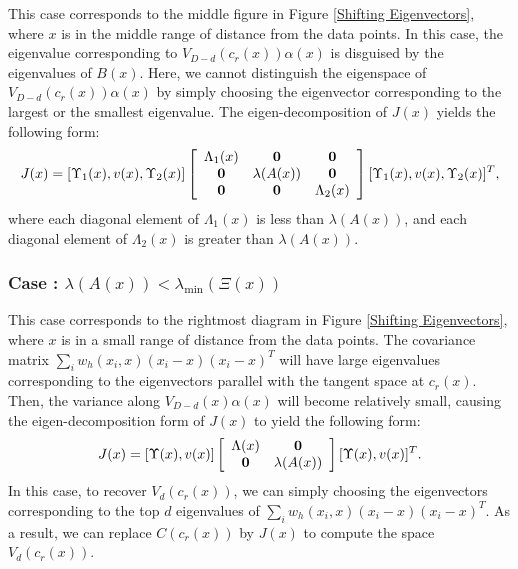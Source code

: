 \documentclass[aos,preprint]{imsart}
\theoremstyle{remark}
\newtheorem*{remark}{Remark}
\begin{document}
This case corresponds to the middle figure in {Figure \ref{Shifting Eigenvectors}}, where $x$ is in the middle range of distance from the data points. In this case, the eigenvalue corresponding to $V_{D-d}(c_r(x))\alpha(x)$ is disguised by the eigenvalues of $B(x)$. Here, we cannot distinguish the eigenspace of $V_{D-d}(c_r(x))\alpha(x)$ by simply choosing the eigenvector corresponding to the largest or the smallest eigenvalue. The eigen-decomposition of $J(x)$ yields the following form:
\begin{equation}\label{SVD2}
J (x)= [\Upsilon_1(x), v(x), \Upsilon_2(x)] 
\left[
\begin{array}{ccc}
\Lambda_1(x) & \bf 0 & \bf 0\\
\bf 0 &\lambda(A(x)) &\bf 0 \\
\bf 0 &\bf 0  &\Lambda_2(x) \\
\end{array}
\right][\Upsilon_1(x), v(x), \Upsilon_2(x)]^T,
\end{equation}
where each diagonal element of $\Lambda_1(x)$ is less than $\lambda(A(x))$, and each diagonal element of $\Lambda_2(x)$ is greater than $\lambda(A(x))$.

\subsubsection*{Case : $\lambda(A(x))<\lambda_{\min} (\Xi(x))$ }

This case corresponds to the rightmost diagram in {Figure \ref{Shifting Eigenvectors}}, where $x$ is in a small range of distance from the data points. The covariance matrix $\sum_i w_h(x_i, x)(x_i-x)(x_i-x)^T$ will have large eigenvalues corresponding to the eigenvectors parallel with the tangent space at $c_r(x)$. Then, the variance along $V_{D-d}(x)\alpha(x)$ will become relatively small, causing the eigen-decomposition form of $J(x)$ to yield the following form:
\begin{equation}\label{SVD3}
J (x)= [\Upsilon(x),v(x)] 
\left[
\begin{array}{cc}
\Lambda(x) & \bf 0\\
\bf 0 &\lambda(A(x))
\end{array}
\right][\Upsilon(x), v(x)]^T.
\end{equation}
In this case, to recover $V_d(c_r(x))$, we can simply choosing the eigenvectors corresponding to the top $d$ eigenvalues of $\sum_i w_h(x_i, x)(x_i-x)(x_i-x)^T$. As a result, we can replace $C(c_r(x))$ by $J(x)$ to compute the space $V_d(c_r(x))$.
\end{document}
